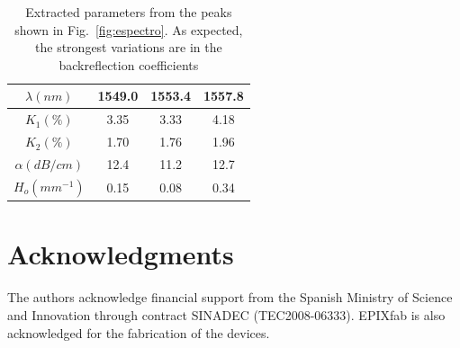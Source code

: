 \documentclass[conference,letterpaper,final]{IEEEtran}
\begin{document}
%
\begin{table}[!t]
\renewcommand{\arraystretch}{1.3}
\label{results_table}
\centering
\begin{tabular}{|c|c|c|c|}
\hline
$\lambda(nm)$&1549.0&1553.4&1557.8 \\
\hline
\hline
$K_1(\%)$ & 3.35 & 3.33 & 4.18\\
\hline
$K_2(\%)$ & 1.70 & 1.76 & 1.96\\
\hline
$\alpha (dB/cm)$ & 12.4 & 11.2 & 12.7\\
\hline
$H_o (mm^{-1})$ & 0.15 & 0.08 & 0.34\\
\hline
\end{tabular}
\caption{Extracted parameters from the peaks shown in Fig.~\ref{fig:espectro}. As expected, the strongest variations are in the backreflection coefficients}
\end{table}

\section*{Acknowledgments}


The authors acknowledge financial support from the Spanish Ministry of Science and Innovation through contract SINADEC (TEC2008-06333). EPIXfab is also acknowledged for the fabrication of the devices.





\end{document}
